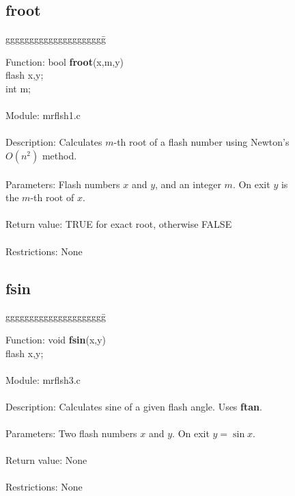 \subsection{froot}

\begin{tabbing}
ggggggggggggggggggggg\= \kill


      Function:      \>bool {\bf froot}(x,m,y) \\
                     \>flash x,y; \\
                     \>int m; \\
      \ \\
      Module:        \>mrflsh1.c \\
      \ \\
      Description:   \>Calculates $m$-th root of a flash number using Newton's \\
                     \>$O(n^2)$ method. \\
      \ \\
      Parameters:    \>Flash numbers $x$ and $y$, and an integer $m$. On exit $y$ is \\
                     \>the $m$-th root of $x$. \\
      \ \\
      Return value:  \>TRUE for exact root, otherwise FALSE \\
      \ \\
      Restrictions:  \>None \\

\end{tabbing}
\pagebreak
\subsection{fsin}

\begin{tabbing}
ggggggggggggggggggggg\= \kill

      Function:      \>void {\bf fsin}(x,y) \\
                     \>flash x,y; \\
      \ \\
      Module:        \>mrflsh3.c \\
      \ \\
      Description:   \>Calculates sine of a given flash angle. Uses {\bf ftan}. \\
      \ \\
      Parameters:    \>Two flash numbers $x$ and $y$. On exit $y=\sin x$. \\
      \ \\
      Return value:  \>None \\
      \ \\
      Restrictions:  \>None \\

\end{tabbing}

